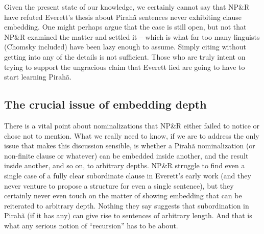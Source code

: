 \documentclass[output=paper,colorlinks,citecolor=brown
]{langscibook}
\begin{document}
\begin{sloppypar}
Given the present state of our knowledge, we certainly cannot say that
NP\&R have refuted Everett's thesis about Pirah{\~a} sentences never
exhibiting clause embedding. One might perhaps argue that the case
is still open, but not that NP\&R examined the matter and settled it
-- which is what far too many linguists (Chomsky included) have been
lazy enough to assume. Simply citing \citet{NevPesRod09a} without
getting into any of the details is not sufficient. Those who are truly
intent on trying to support the ungracious claim that Everett lied
are going to have to start learning Pirah{\~a}.
\end{sloppypar}

\subsection{The crucial issue of embedding depth}\largerpage

There is a vital point about nominalizations that NP\&R either failed
to notice or chose not to mention. What we really need to know, if we
are to address the only issue that makes this discussion sensible, is
whether a Pirah{\~a} nominalization (or non-finite clause or whatever)
can be embedded inside another, and the result inside another, and so
on, to arbitrary depths. NP\&R struggle to find even a single case of
a fully clear subordinate clause in Everett's early work (and they
never venture to propose a structure for even a single sentence), but
they certainly never even touch on the matter of showing embedding that
can be reiterated to arbitrary depth. Nothing they say suggests that
subordination in Pirah{\~a} (if it has any) can give rise to sentences
of arbitrary length. And that is what any serious notion of ``recursion''
has to be about.
\end{document}
